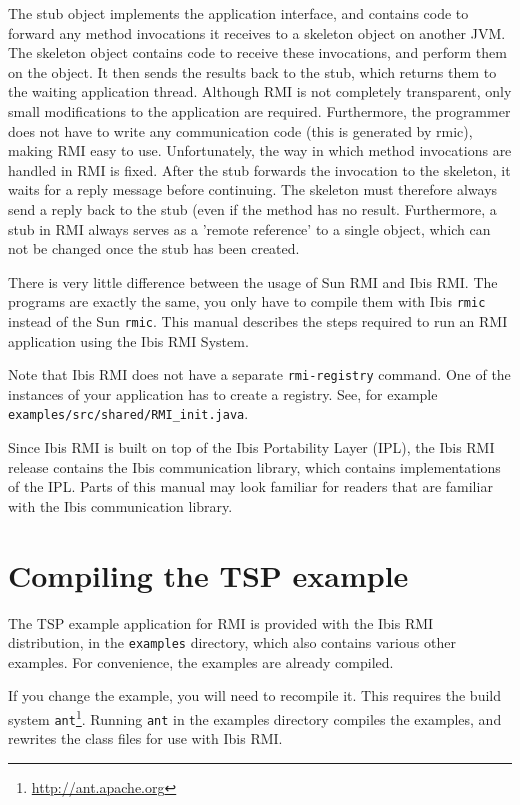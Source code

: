 \documentclass[a4paper,10pt]{article}
\begin{document}
The stub object implements the application interface, and contains
code to forward any method invocations it receives to a skeleton
object on another JVM. The skeleton object contains code to receive
these invocations, and perform them on the object. It then sends the
results back to the stub, which returns them to the waiting
application thread.  Although RMI is not completely transparent, only
small modifications to the application are required. Furthermore, the
programmer does not have to write any communication code (this is
generated by rmic), making RMI easy to use. Unfortunately, the way in
which method invocations are handled in RMI is fixed. After the stub
forwards the invocation to the skeleton, it waits for a reply message
before continuing. The skeleton must therefore always send a reply
back to the stub (even if the method has no result. Furthermore, a
stub in RMI always serves as a 'remote reference' to a single object,
which can not be changed once the stub has been created.

There is very little difference between the usage of Sun RMI and Ibis
RMI. The programs are exactly the same, you only have to compile them
with Ibis \texttt{rmic} instead of the Sun \texttt{rmic}. 
This manual describes the steps required to run an RMI application
using the Ibis RMI System.

Note that Ibis RMI does not have a separate \texttt{rmi-registry} command.
One of the instances of your application has to create a registry.
See, for example \texttt{examples/src/shared/RMI\_init.java}.


Since Ibis RMI is built on top of the Ibis Portability Layer (IPL),
the Ibis RMI release contains the Ibis communication library, which contains
implementations of the IPL. Parts of this manual may look familiar for
readers that are familiar with the Ibis communication library.

\section{Compiling the TSP example}

The TSP example application for RMI is
provided with the Ibis RMI distribution, in the \texttt{examples} directory,
which also contains various other examples.
For convenience, the examples are already compiled.

If you change the example, you will need to recompile it. This
requires the build system \texttt{ant}\footnote{\url{http://ant.apache.org}}.
Running \texttt{ant} in the examples directory compiles the examples,
and rewrites the class files for use with Ibis RMI.
\end{document}
